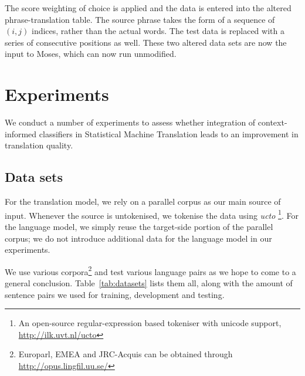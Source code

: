 \documentclass[smallextended]{svjour3}       %
\theoremstyle{break}
\begin{document}
The score weighting of choice is applied and the data is entered into the
altered phrase-translation table. The source phrase takes the form of a
sequence of $(i,j)$ indices, rather than the actual words. The test data is
replaced with a series of consecutive positions as well. These two altered data
sets are now the input to Moses, which can now run unmodified. 

\section{Experiments}

We conduct a number of experiments to assess whether integration of
context-informed classifiers in Statistical Machine Translation leads to
an improvement in translation quality. 

\subsection{Data sets}

For the translation model, we rely on a parallel corpus as our main source of
input. Whenever the source is untokenised, we tokenise the data using
\emph{ucto} \footnote{An open-source regular-expression based tokeniser with
unicode support, \url{http://ilk.uvt.nl/ucto}}. For the language model, we
simply reuse the target-side portion of the parallel corpus; we do not
introduce additional data for the language model in our experiments.

We use various corpora\footnote{Europarl, EMEA and JRC-Acquis can be obtained through
\url{http://opus.lingfil.uu.se/}} and test various language pairs as we hope to
come to a general conclusion. Table~\ref{tab:datasets} lists them all, along with the amount of
sentence pairs we used for training, development and testing.
\end{document}
